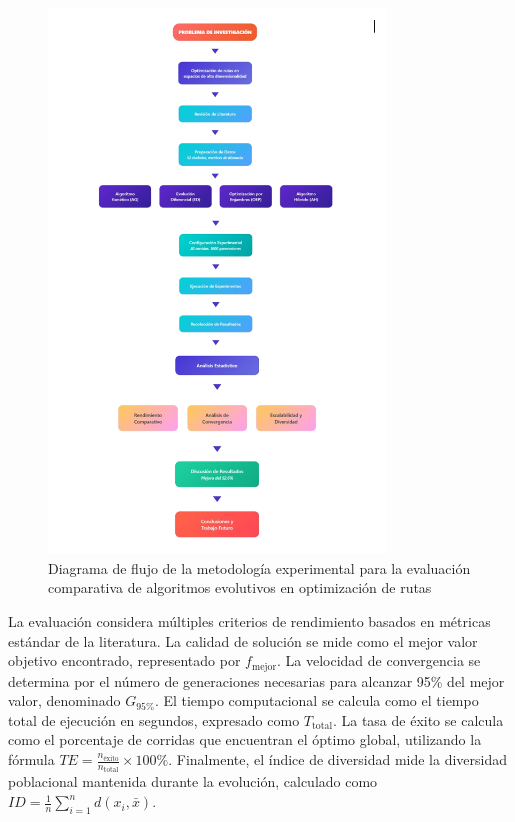 \documentclass[10pt,a4paper]{article}
\begin{document}
\begin{figure}[htbp]

\centering
\includegraphics[width=0.8\textwidth]{diagrama.png}
\caption{Diagrama de flujo de la metodología experimental para la evaluación comparativa de algoritmos evolutivos en optimización de rutas}
\label{fig:methodology_flowchart}
\end{figure}


La evaluación considera múltiples criterios de rendimiento basados en métricas estándar de la literatura. La calidad de solución se mide como el mejor valor objetivo encontrado, representado por $f_{\text{mejor}}$. La velocidad de convergencia se determina por el número de generaciones necesarias para alcanzar 95\% del mejor valor, denominado $G_{95\%}$. El tiempo computacional se calcula como el tiempo total de ejecución en segundos, expresado como $T_{\text{total}}$. La tasa de éxito se calcula como el porcentaje de corridas que encuentran el óptimo global, utilizando la fórmula $TE = \frac{n_{\text{éxito}}}{n_{\text{total}}} \times 100\%$. Finalmente, el índice de diversidad mide la diversidad poblacional mantenida durante la evolución, calculado como $ID = \frac{1}{n}\sum_{i=1}^{n}d(x_i, \bar{x})$.
\end{document}
